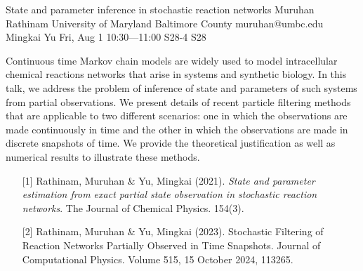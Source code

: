 \begin{talk}
  {State and parameter inference in stochastic reaction networks}%
  {Muruhan Rathinam}%
  {University of Maryland Baltimore County}%
  {muruhan@umbc.edu}%
  {Mingkai Yu}%
  {}%
  {Fri, Aug 1 10:30---11:00}%
  {S28-4}%
  {S28}%
  
    
Continuous time Markov chain models are widely used to model intracellular chemical reactions networks that arise in systems and synthetic biology. In this talk, we address the problem of inference of state and parameters of such systems from partial observations. We present details of recent particle filtering methods that are applicable to two different scenarios: one in which the observations are made continuously in time and the other in which the observations are made in discrete snapshots of time.            We provide the theoretical justification as well as numerical results to illustrate these methods.       
   
\medskip

\begin{enumerate}
 \item[{[1]}] Rathinam, Muruhan \& Yu, Mingkai (2021). {\it State and parameter estimation from exact partial state observation in stochastic reaction networks}. The Journal of Chemical Physics. 
 154(3).
 \item[{[2]}] Rathinam, Muruhan \& Yu, Mingkai (2023). Stochastic Filtering of Reaction Networks Partially Observed in Time Snapshots. Journal of Computational Physics. 
Volume 515, 15 October 2024, 113265. 

\end{enumerate}

\end{talk}

